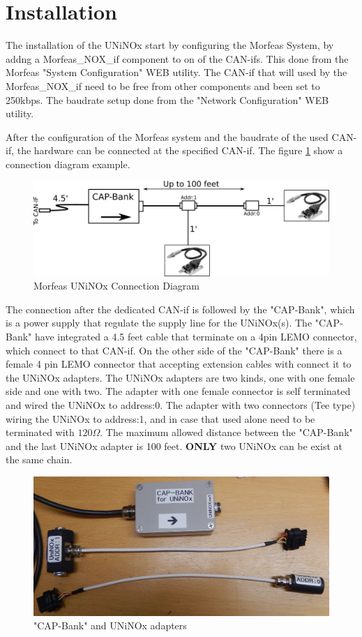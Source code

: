 \section{Installation}
The installation of the UNiNOx start by configuring the Morfeas System, by addng a Morfeas\_NOX\_if component to on of the CAN-ifs.
This done from the Morfeas "System Configuration" WEB utility.
The CAN-if that will used by the Morfeas\_NOX\_if need to be free from other components and been set to 250kbps.
The baudrate setup done from the "Network Configuration" WEB utility.

After the configuration of the Morfeas system and the baudrate of the used CAN-if, the hardware can be connected at the specified CAN-if.
The figure \ref{fig:NOX_conn} show a connection diagram example.

\begin{figure}[h]
\centering
	\includegraphics[width=5in,angle=0]{../art/Morfeas_web_if/connection_diagram.png}
	\caption{Morfeas UNiNOx Connection Diagram}
	\label{fig:NOX_conn}
\end{figure}

The connection after the dedicated CAN-if is followed by the "CAP-Bank",
which is a power supply that regulate the supply line for the UNiNOx(s).
The "CAP-Bank" have integrated a 4.5 feet cable that terminate on a 4pin LEMO connector, which connect to that CAN-if.
On the other side of the "CAP-Bank" there is a female 4 pin LEMO connector that accepting extension cables with connect it to
the UNiNOx adapters. The UNiNOx adapters are two kinds, one with one female side and one with two.
The adapter with one female connector is self terminated and wired the UNiNOx to address:0.
The adapter with two connectors (Tee type) wiring the UNiNOx to address:1, and in case that used alone need to be terminated with $120\Omega$.
The maximum allowed distance between the "CAP-Bank" and the last UNiNOx adapter is 100 feet. 
\textbf{ONLY} two UNiNOx can be exist at the same chain.

\begin{figure}[h]
\centering
	\includegraphics[width=5in,angle=0]{../art/Morfeas_web_if/UniNOx_adapters.png}
	\caption{"CAP-Bank" and UNiNOx adapters}
\end{figure}
